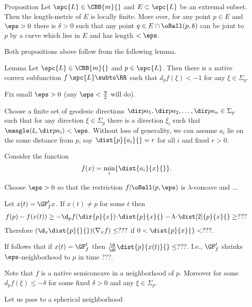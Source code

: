\begin{thm}{Proposition}
Let $\spc{L}\in\CBB{m}{}$ and $E\subset \spc{L}$ be an extremal subset.
Then the length-metric of $E$ is locally finite.
More over, for any point $p\in E$ and $\eps>0$ there is $\delta>0$
such that any point $q\in E\cap \oBall(p,\delta)$ can be joint to $p$
by a curve which lies in $E$ and has length $<\eps$.

\end{thm}

Both propositions above follow from the following lemma.

\begin{thm}{Lemma}
Let $\spc{L}\in\CBB{m}{}$ and $p\in \spc{L}$.
Then there is a native convex subfunction $f\:\spc{L}\subto\RR$
such that $d_pf(\xi)<-1$ for any $\xi\in\Sigma_p$.

\end{thm}

Fix small $\eps>0$ (any $\eps<\tfrac\pi2$ will do).

Choose a finite set of geodesic directions 
$\dir p {a_1},\dir p {a_2},\dots,\dir p {a_n}\in \Sigma_p$ 
such that for any direction $\xi\in \Sigma_p$ there is a direction $\xi_i$
such that $\mangle(\xi,\dir p {a_i})<\eps$.
Without loss of generality, we can assume $a_i$ lie on the same distance from $p$, say $\dist{p}{a_i}{}=r$ for all $i$ and fixed $r>0$.

Consider the function 
$$f(x)=\min_i\{\dist{a_i}{x}{}\}.$$

Choose $\eps>0$ so that the restriction $f|\oBall(p,\eps)$ is $\lambda$-concave
and ...

Let $x(t)=\GF_f^t x$.
If $x(t)\ne p$ for some $t$ then 
\begin{align*}
f(p)-f(x(t))
\ge 
-\d_pf(\dir{p}{x})\cdot \dist{p}{x}{}-\lambda\cdot \dist[2]{p}{x}{}
\ge ???
\end{align*}
Therefore 
$(\d_x\dist{p}{}{})(\nabla_xf)\le ???$ 
if $0<\dist{p}{x}{}<???$.

If follows that if $x(t)=\GF^t_f$ then 
$\tfrac{\d}{\d t}{}\dist{p}{x(t)}{}\le ???$.
I.e., $\GF^t_f$ shrinks $\eps$-neighborhood to $p$ in time ???. 


Note that $f$ is a native semiconcave in a neighborhood of $p$.
Moreover for some $d_pf(\xi)\le -\delta$ for some fixed $\delta>0$ and any $\xi\in\Sigma_p$. 

Let us pass to a spherical neighborhood 
\qeds




